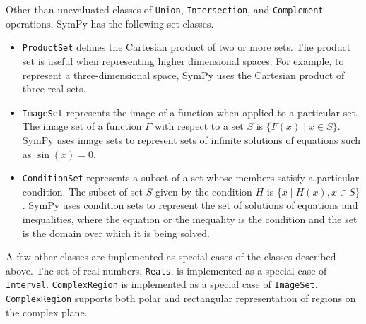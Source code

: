 
Other than unevaluated classes of \texttt{Union}, \texttt{Intersection}, and
\texttt{Complement} operations, SymPy has the following set classes.

\begin{itemize}

    \item \verb|ProductSet| defines the Cartesian product of two
        or more sets. The product set is useful when representing higher
        dimensional spaces. For example, to represent a three-dimensional space,
        SymPy uses the Cartesian product of three real sets.

      \item \verb|ImageSet| represents the image of a function when applied to
        a particular set. The image set of a function $F$ with respect to a set
        $S$ is $\{ F(x) \mid x \in S \}$. SymPy uses image sets to represent sets
        of infinite solutions of equations such as $\sin(x)=0$.


      \item \verb|ConditionSet| represents a subset of a set whose members
        satisfy a particular condition. The subset of set $S$
        given by the condition $H$ is $\{x \mid H(x), x \in S \}$. SymPy uses
        condition sets to represent the set of solutions of equations and
        inequalities, where the equation or the inequality is the condition and
        the set is the domain over which it is being solved.

\end{itemize}

A few other classes are implemented as special cases of the classes described
above. The set of real numbers, \verb|Reals|, is implemented as a special case
of \verb|Interval|. \verb|ComplexRegion|
is implemented as a special case of \verb|ImageSet|. \verb|ComplexRegion|
supports both polar and rectangular representation of regions on the complex
plane.
